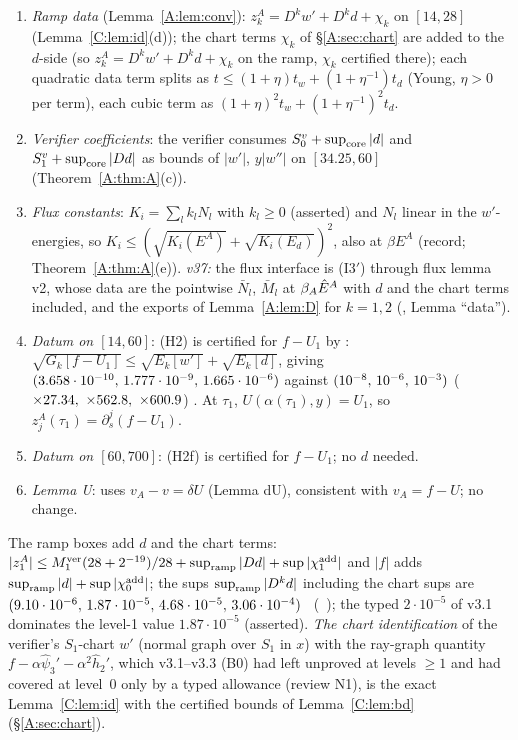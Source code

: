 \documentclass[11pt]{article}
\begin{document}
\begin{remark}\label{A:rem:B0}
\begin{enumerate}[label=(I\arabic*),leftmargin=2.4em]
\item \emph{Ramp data} (Lemma~\ref{A:lem:conv}): $z^A_k=D^k w'+D^kd+\chi_k$ on $[14,28]$ (Lemma~\ref{C:lem:id}(d)); the chart terms $\chi_k$ of \S\ref{A:sec:chart} are added to the $d$-side (so $z^A_k=D^kw'+D^kd+\chi_k$ on the ramp, $\chi_k$ certified there); each quadratic data term splits as $t\le(1+\eta)t_w+(1+\eta^{-1})t_d$ (Young, $\eta>0$ per term), each cubic term as $(1+\eta)^2t_w+(1+\eta^{-1})^2t_d$.
\item \emph{Verifier coefficients}: the verifier consumes $S^v_0+\sup_{\rm core}|d|$ and $S^v_1+\sup_{\rm core}|Dd|$ as bounds of $|w'|$, $y|w''|$ on $[34.25,60]$ (Theorem~\ref{A:thm:A}(c)).
\item \emph{Flux constants}: $K_i=\sum_lk_lN_l$ with $k_l\ge0$ (asserted) and $N_l$ linear in the $w'$-energies, so $K_i\le(\sqrt{K_i(E^A)}+\sqrt{K_i(E_d)})^2$, also at $\beta E^A$ (record; Theorem~\ref{A:thm:A}(e)). \emph{v37:} the flux interface is (I3$'$) through flux lemma v2, whose data are the pointwise $\bar N_l$, $\bar M_l$ at $\beta_A\hat E^A$ with $d$ and the chart terms included, and the exports of Lemma~\ref{A:lem:D} for $k=1,2$ (, Lemma ``data'').
\item \emph{Datum on $[14,60]$}: (H2) is certified for $f-U_1$ by : $\sqrt{G_k[f-U_1]}\le\sqrt{E_k[w']}+\sqrt{E_k[d]}$, giving $(3.658\cdot10^{-10},\,1.777\cdot10^{-9},\,1.665\cdot10^{-6})$ against $(10^{-8},\,10^{-6},\,10^{-3})$ ($\times27.34,\ \times562.8,\ \times600.9$) \tC. At $\tau_1$, $U(\alpha(\tau_1),y)=U_1$, so $z^A_j(\tau_1)=\partial_s^j(f-U_1)$.
\item \emph{Datum on $[60,700]$}: (H2f) is certified for $f-U_1$; no $d$ needed.
\item \emph{Lemma U}: uses $v_A-v=\delta U$ (Lemma dU), consistent with $v_A=f-U$; no change.
\end{enumerate}
The ramp boxes add $d$ and the chart terms: $|z^A_1|\le M_1^{\rm ver}(28+2^{-19})/28+\sup_{\rm ramp}|Dd|+\sup|\chi^{\rm add}_1|$ and $|f|$ adds $\sup_{\rm ramp}|d|+\sup|\chi^{\rm add}_0|$; the sups $\sup_{\rm ramp}|D^kd|$ including the chart sups are $(9.10\cdot10^{-6},\,1.87\cdot10^{-5},\,4.68\cdot10^{-5},\,3.06\cdot10^{-4})$ \tC\ (\SA\ ); the typed $2\cdot10^{-5}$ of v3.1 dominates the level-1 value $1.87\cdot10^{-5}$ (asserted). \emph{The chart identification} of the verifier's $S_1$-chart $w'$ (normal graph over $S_1$ in $x$) with the ray-graph quantity $f-\alpha\hat\psi_3'-\alpha^2\hat h_2'$, which v3.1--v3.3 (B0) had left unproved at levels $\ge1$ and had covered at level~0 only by a typed allowance (review N1), is the exact Lemma~\ref{C:lem:id} with the certified bounds of Lemma~\ref{C:lem:bd} (\S\ref{A:sec:chart}).
\end{remark}
\end{document}
